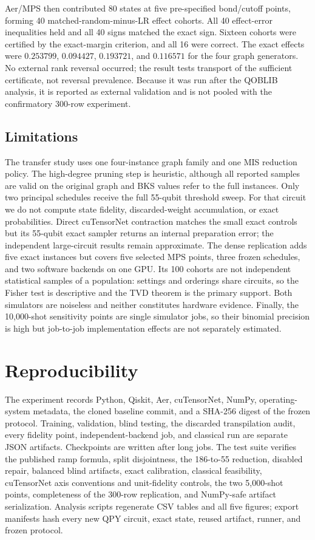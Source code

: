 \documentclass[10pt,twocolumn]{article}
\begin{document}
Aer/MPS then contributed 80 states at five pre-specified bond/cutoff points,
forming 40 matched-random-minus-LR effect cohorts. All 40 effect-error
inequalities held and all 40 signs matched the exact sign. Sixteen cohorts
were certified by the exact-margin criterion, and all 16 were correct. The
exact effects were $0.253799$, $0.094427$, $0.193721$, and $0.116571$ for the
four graph generators. No external rank reversal occurred; the result tests
transport of the sufficient certificate, not reversal prevalence. Because it
was run after the QOBLIB analysis, it is reported as external validation and
is not pooled with the confirmatory 300-row experiment.

\subsection{Limitations}

The transfer study uses one four-instance graph family and one MIS reduction
policy. The
high-degree pruning step is heuristic, although all reported samples are valid
on the original graph and BKS values refer to the full instances. Only two
principal schedules receive the full 55-qubit threshold sweep. For that circuit
we do not compute state fidelity, discarded-weight accumulation, or exact
probabilities. Direct cuTensorNet contraction matches the small exact controls
but its 55-qubit exact sampler returns an internal preparation error; the
independent large-circuit results remain approximate. The dense replication
adds five exact instances but covers five selected MPS points, three frozen
schedules, and two software backends on one GPU. Its 100 cohorts are not
independent statistical samples of a population: settings and orderings share
circuits, so the Fisher test is descriptive and the TVD theorem is the primary
support. Both simulators are noiseless and neither constitutes hardware
evidence. Finally, the
10,000-shot sensitivity points are single simulator jobs, so their binomial
precision is high but job-to-job implementation effects are not separately
estimated.

\section{Reproducibility}

The experiment records Python, Qiskit, Aer, cuTensorNet, NumPy, operating-system metadata,
the cloned baseline commit, and a SHA-256 digest of the frozen protocol.
Training, validation, blind testing, the discarded transpilation audit, every
fidelity point, independent-backend job, and classical run are separate JSON
artifacts. Checkpoints are written after long jobs. The test suite verifies
the published ramp formula, split disjointness, the 186-to-55 reduction,
disabled repair, balanced blind artifacts, exact calibration, classical
feasibility, cuTensorNet axis conventions and unit-fidelity controls, the two
5,000-shot points, completeness of the 300-row replication, and NumPy-safe
artifact serialization. Analysis scripts regenerate CSV tables and all five
figures; export manifests hash every new QPY circuit, exact state, reused
artifact, runner, and frozen protocol.
\end{document}
